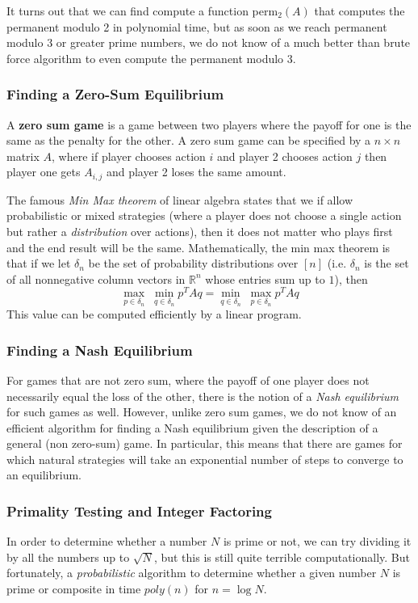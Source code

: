 \documentclass{article}
\begin{document}
  It turns out that we can find compute a function perm$_2 (A)$ that computes the permanent modulo 2 in polynomial time, but as soon as we reach permanent modulo 3 or greater prime numbers, we do not know of a much better than brute force algorithm to even compute the permanent modulo 3. 

  \subsubsection{Finding a Zero-Sum Equilibrium}

  \begin{definition}
  A \textbf{zero sum game} is a game between two players where the payoff for one is the same as the penalty for the other. A zero sum game can be specified by a $n \times n$ matrix $A$, where if player chooses action $i$ and player 2 chooses action $j$ then player one gets $A_{i, j}$ and player 2 loses the same amount. 
  \end{definition}

  The famous \textit{Min Max theorem} of linear algebra states that we if allow probabilistic or mixed strategies (where a player does not choose a single action but rather a \textit{distribution} over actions), then it does not matter who plays first and the end result will be the same. Mathematically, the min max theorem is that if we let $\delta_n$ be the set of probability distributions over $[n]$ (i.e. $\delta_n$ is the set of all nonnegative column vectors in $\mathbb{R}^n$ whose entries sum up to $1$), then 
  \[\max_{p \in \delta_n} \; \min_{q \in \delta_n} p^T A q = \min_{q \in \delta_n} \; \max_{p \in \delta_n} p^T A q\]
  This value can be computed efficiently by a linear program. 

  \subsubsection{Finding a Nash Equilibrium}
  For games that are not zero sum, where the payoff of one player does not necessarily equal the loss of the other, there is the notion of a \textit{Nash equilibrium} for such games as well. However, unlike zero sum games, we do not know of an efficient algorithm for finding a Nash equilibrium given the description of a general (non zero-sum) game. In particular, this means that there are games for which natural strategies will take an exponential number of steps to converge to an equilibrium. 

  \subsubsection{Primality Testing and Integer Factoring}
  In order to determine whether a number $N$ is prime or not, we can try dividing it by all the numbers up to $\sqrt{N}$, but this is still quite terrible computationally. But fortunately, a \textit{probabilistic} algorithm to determine whether a given number $N$ is prime or composite in time $poly(n)$ for $n = \log N$. 
\end{document}
